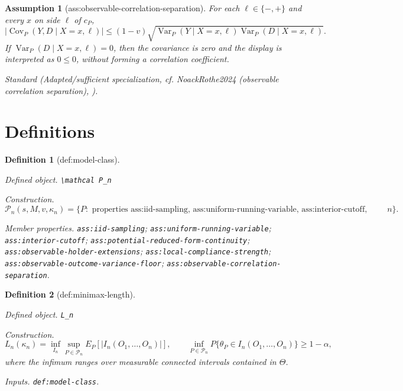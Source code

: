 \documentclass{article}
\newtheorem{assumption}{Assumption}
\newtheorem{definition}{Definition}
\begin{document}
\begin{assumption}[ass:observable-correlation-separation]\label{ass:observable-correlation-separation}
For each \(\ell\in\{-,+\}\) and every \(x\) on side \(\ell\) of \(c_P\), \[|\operatorname{Cov}_P(Y,D\mid X=x,\ell)|\le(1-v)\sqrt{\operatorname{Var}_P(Y\mid X=x,\ell)\operatorname{Var}_P(D\mid X=x,\ell)}.\] If \(\operatorname{Var}_P(D\mid X=x,\ell)=0\), then the covariance is zero and the display is interpreted as \(0\le0\), without forming a correlation coefficient.
\par\smallskip\noindent\emph{Standard} (Adapted/sufficient specialization, cf. NoackRothe2024 (observable correlation separation), \cite{NoackRothe2024}).
\end{assumption}

\section{Definitions}

\begin{definition}[def:model-class]\label{def:model-class}
\par\smallskip\noindent\emph{Defined object.} \texttt{\textbackslash{}\allowbreak{}mathcal P\_\allowbreak{}n}
\par\smallskip\noindent\emph{Construction.} \[\mathcal P_n(s,M,v,\kappa_n)=\{P:\text{ properties ass:iid-sampling, ass:uniform-running-variable, ass:interior-cutoff, ass:potential-reduced-form-continuity, ass:observable-holder-extensions, ass:local-compliance-strength, ass:observable-outcome-variance-floor, and ass:observable-correlation-separation hold at index }n\}.\]
\par\smallskip\noindent\emph{Member properties.} \texttt{ass:\allowbreak{}iid-\allowbreak{}sampling}; \texttt{ass:\allowbreak{}uniform-\allowbreak{}running-\allowbreak{}variable}; \texttt{ass:\allowbreak{}interior-\allowbreak{}cutoff}; \texttt{ass:\allowbreak{}potential-\allowbreak{}reduced-\allowbreak{}form-\allowbreak{}continuity}; \texttt{ass:\allowbreak{}observable-\allowbreak{}holder-\allowbreak{}extensions}; \texttt{ass:\allowbreak{}local-\allowbreak{}compliance-\allowbreak{}strength}; \texttt{ass:\allowbreak{}observable-\allowbreak{}outcome-\allowbreak{}variance-\allowbreak{}floor}; \texttt{ass:\allowbreak{}observable-\allowbreak{}correlation-\allowbreak{}separation}.
\end{definition}

\begin{definition}[def:minimax-length]\label{def:minimax-length}
\par\smallskip\noindent\emph{Defined object.} \texttt{L\_\allowbreak{}n}
\par\smallskip\noindent\emph{Construction.} \[L_n(\kappa_n)=\inf_{I_n}\sup_{P\in\mathcal P_n}E_P[|I_n(O_1,\ldots,O_n)|],\qquad \inf_{P\in\mathcal P_n}P\{\theta_P\in I_n(O_1,\ldots,O_n)\}\ge1-\alpha,\] where the infimum ranges over measurable connected intervals contained in \(\Theta\).
\par\smallskip\noindent\emph{Inputs.} \texttt{def:\allowbreak{}model-\allowbreak{}class}.
\end{definition}
\end{document}
